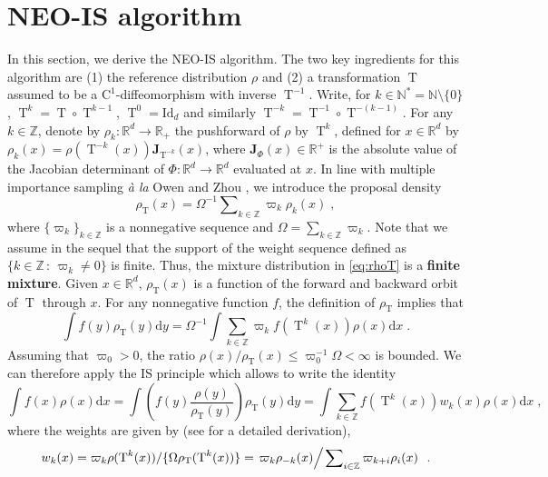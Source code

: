 \documentclass{article}
\def\transfo{\operatorname{T}}
\def\rmd{\operatorname{d}\hspace{-2pt}}
\def\rset{\mathbb{R}}
\def\nset{\mathbb{N}}
\def\nsets{\mathbb{N}^*}
\def\dummy{f}
\def\rmd{\mathrm{d}}
\def\eqsp{\,}
\def\eqsp{\;}
\newcommand{\1}{\mathds{1}}
\def\proposal{\rho}
\def\Jac{\mathbf{J}}
\newcommand{\JacOp}[1]{\Jac_{#1}}
\def\rset{\mathbb{R}}
\def\zset{\mathbb{Z}}
\def\nset{\mathbb{N}}
\def\nsets{\mathbb{N}^*}
\def\rmd{\mathrm{d}}
\def\rmC{\mathrm{C}}
\def\Idd{\mathrm{Id}}
\def\rhoT{\rho_{\transfo}}
\begin{document}
\section{NEO-IS algorithm}
In this section, we derive the  NEO-IS algorithm.
The two key ingredients for this algorithm are  (1) the reference distribution $\proposal$ and (2) a transformation $\transfo$ assumed to be a $\rmC^1$-diffeomorphism with inverse $\transfo^{-1}$. Write, for $k \in \nsets = \nset \setminus\{0\}$, $\transfo^{k}=\transfo\circ\transfo^{k-1}$, $\transfo^{0}=\Idd_{d}$ and similarly $\transfo^{-k}=\transfo^{-1}\circ\transfo^{-(k-1)}$.
For any $k \in \zset$, denote by $\rho_k : \rset^d \to \rset_+$ the pushforward of $\rho$ by $\transfo^k$,  defined for $x\in\rset^d$ by $\rho_k(x)= \rho(\transfo^{-k}(x)) \JacOp{\transfo^{-k}}(x)$,
where ${\JacOp{\Phi}(x)}\in\rset^+$ is the absolute value of the Jacobian determinant of $\Phi: \rset^d\to \rset^d$ evaluated at $x$. In line with multiple importance sampling \emph{\`a la} Owen and Zhou \cite{owen:zhou:2000}, we introduce the proposal density
\begin{equation}\label{eq:rhoT}
    \rhoT(x) = \Omega^{-1}\sum\nolimits_{k \in\zset} \varpi_k \rho_k(x)\eqsp,
  \end{equation}
where $\{\varpi_k\}_{k \in\zset}$ is a  nonnegative sequence and $\Omega= \sum_{k \in \zset} \varpi_k$. Note that we assume in the sequel that the support of the weight sequence defined as $\{ k \in \zset\, :\, \varpi_k \neq 0\}$ is finite. Thus, the mixture distribution in \eqref{eq:rhoT} is a \textbf{finite mixture}. Given $x \in \rset^d$, $\rhoT(x)$ is a function of the forward and backward orbit of $\transfo$ through $x$.  For any nonnegative function $\dummy$, the definition of $\rhoT$ implies that 
$$
\int\dummy(y)\rhoT(y)\rmd y = \Omega^{-1} \int \sum_{k\in\zset}\varpi_k f(\transfo^k(x)) \rho(x)\rmd x\eqsp.
$$
Assuming that $\varpi_0>0$,  the ratio  $\rho(x)/\rhoT(x) \leq \varpi_0^{-1}\Omega<\infty$ is bounded. We can therefore apply the IS principle  which allows to write the identity
\begin{equation}
\label{eq:key-relation}
\int \dummy(x) \rho(x)  \rmd x =\int \left(\dummy(y) \frac{\rho(y)}{\rhoT(y)}\right) \rhoT(y)  \rmd y=\int \sum_{k\in\zset}  \dummy(\transfo^{k}(x)) w_k(x) \rho(x)  \rmd x \eqsp,
\end{equation}
where  the weights are given by (see   for a detailed derivation),
\begin{equation}
    \label{eq:def_w_k}
  { w_k(x)=\varpi_k \rho(\transfo^{k}(x)) / \{\Omega\rhoT(\transfo^k(x))\} = \left.  \varpi_k \rho_{-k}(x) \middle / \left. \sum\nolimits_{i\in\zset}\varpi_{k+i} \rho_{i}(x) \right. \right. \eqsp.}
\end{equation} 
\end{document}
